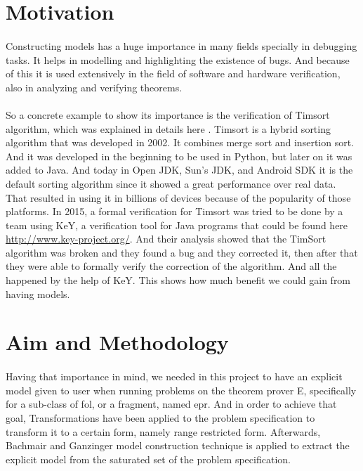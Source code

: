 	
	\section{Motivation}

	\paragraph{}
	Constructing models has a huge importance in many fields specially in debugging tasks. It helps in modelling and highlighting the existence of bugs. And because of this it is used extensively in the field of software and hardware verification, also in analyzing and verifying theorems.

	\paragraph{}
	So a concrete example to show its importance is the verification of Timsort algorithm, which was explained in details here \cite{TIMSORT}. Timsort is a hybrid sorting algorithm that was developed in 2002. It combines merge sort and insertion sort. And it was developed in the beginning to be used in Python, but later on it was added to Java. And today in Open JDK, Sun's JDK, and Android SDK it is the default sorting algorithm since it showed a great performance over real data. That resulted in using it in billions of devices because of the popularity of those platforms. In 2015, a formal verification for Timsort was tried to be done by a team using KeY, a verification tool for Java programs that could be found here \url{http://www.key-project.org/}. And their analysis showed that the TimSort algorithm was broken and they found a bug and they corrected it, then after that they were able to formally verify the correction of the algorithm. And all the happened by the help of KeY. This shows how much benefit we could gain from having models.



	\section{Aim and Methodology}

	\paragraph{}
	Having that importance in mind, we needed in this project to have an explicit model given to user when running problems on the theorem prover E, specifically for a sub-class of \ac{fol}, or a fragment, named \acf{epr}. And in order to achieve that goal, Transformations have been applied to the problem specification to transform it to a certain form, namely range restricted form. Afterwards, Bachmair and Ganzinger model construction technique is applied to extract the explicit model from the saturated set of the problem specification. 



